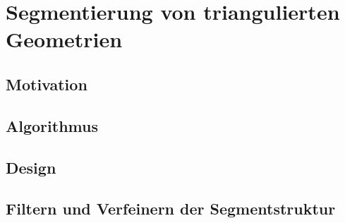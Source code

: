 \chapter{Segmentierung von triangulierten Geometrien}
\label{cha:segment}
	
\section{Motivation}


\section{Algorithmus}

\section{Design}


\section{Filtern und Verfeinern der Segmentstruktur}
